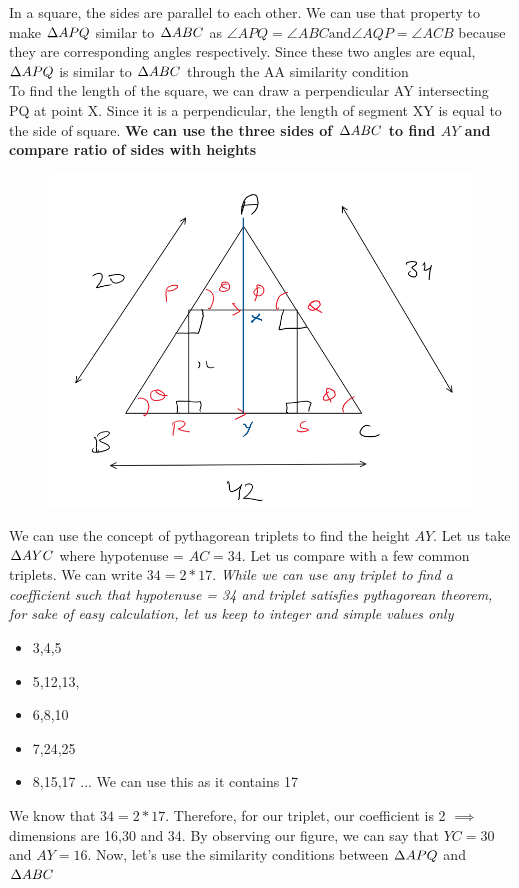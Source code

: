 In a square, the sides are parallel to each other. We can use that property to make $\Delta {APQ}$ similar to $\Delta {ABC}$ as $\angle{APQ} = \angle{ABC} \text{and} \angle{AQP} = \angle{ACB}$ because they are corresponding angles respectively. Since these two angles are equal, $\Delta {APQ}$ is similar to $\Delta {ABC}$ through the AA similarity condition \\

To find the length of the square, we can draw a perpendicular AY intersecting PQ at point X. Since it is a perpendicular, the length of segment XY is equal to the side of square. \textbf{We can use the three sides of $\Delta {ABC}$ to find $AY$ and compare ratio of sides with heights}

\begin{figure}[h!]
    \centering
    \includegraphics[width=0.5\linewidth]{Quant//Geometry//Images//Triangles/rodha_triangle_6_question_1_1.png}
\end{figure}

We can use the concept of pythagorean triplets to find the height $AY$. Let us take $\Delta {AYC}$ where hypotenuse = $AC = 34$. Let us compare with a few common triplets. We can write $34 = 2 * 17$. \textit{While we can use any triplet to find a coefficient such that hypotenuse = 34 and triplet satisfies pythagorean theorem, for sake of easy calculation, let us keep to integer and simple values only}
\begin{itemize}
    \item 3,4,5 
    \item 5,12,13,
    \item 6,8,10
    \item 7,24,25
    \item 8,15,17 ... We can use this as it contains 17
\end{itemize}

We know that $34 = 2 * 17$. Therefore, for our triplet, our coefficient is 2 $\implies$ dimensions are 16,30 and 34. By observing our figure, we can say that $YC = 30$ and $AY = 16$. Now, let's use the similarity conditions between $\Delta {APQ}$ and $\Delta {ABC}$

